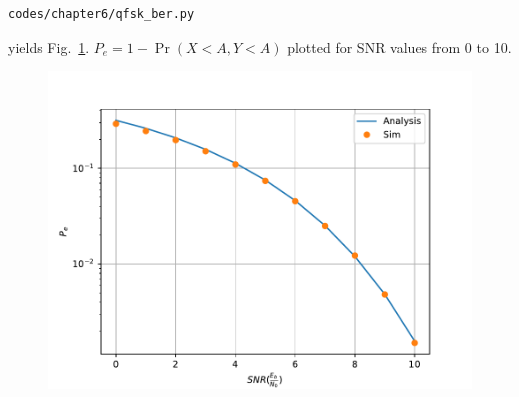 \documentclass[journal,10pt,twocolumn]{IEEEtran}
\newcommand\figref{Fig.~\ref}
\providecommand{\pr}[1]{\ensuremath{\Pr\left(#1\right)}}
\begin{document}
\begin{enumerate}
\begin{enumerate}[label=(\alph{enumii})]
\begin{lstlisting}
codes/chapter6/qfsk_ber.py
\end{lstlisting}
yields \figref{fig:qpsk_ber}. $P_e = 1-\pr{X<A,Y<A}$ plotted for SNR values from 0 to 10.
\begin{figure}[H]
\centering
\includegraphics[width=\columnwidth]{./figs/chapter6/qpsk_ber.pdf}
\caption{}
\label{fig:qpsk_ber}
\end{figure}
\end{enumerate}
\end{enumerate}
\end{document}
